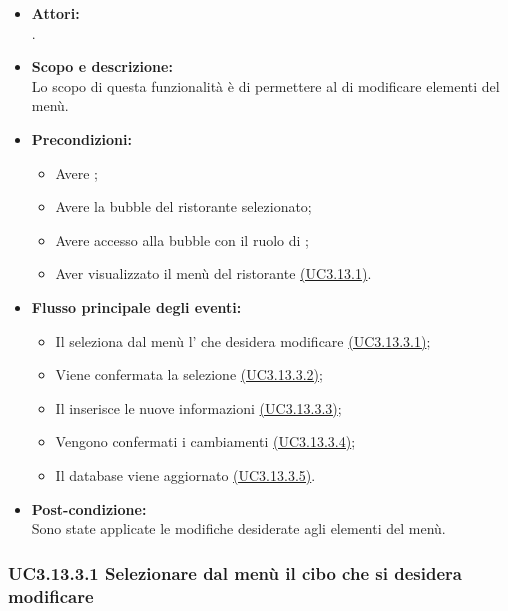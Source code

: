 \begin{itemize}
	\item \textbf{Attori:}
	\\.
	\item \textbf{Scopo e descrizione:} 
	\\Lo scopo di questa funzionalità è di permettere al  di modificare elementi del menù.
	\item \textbf{Precondizioni:}
	\begin{itemize}
		\item Avere ;
		\item Avere la bubble del ristorante selezionato;
		\item Avere accesso alla bubble con il ruolo di ;
		\item Aver visualizzato il menù del ristorante \hyperref[UC3.13.1]{(UC3.13.1)}.
	\end{itemize}
	\item \textbf{Flusso principale degli eventi:}
	\begin{itemize}
		\item Il  seleziona dal menù l’ che desidera modificare \hyperref[UC3.13.3.1]{(UC3.13.3.1)};
		\item Viene confermata la selezione \hyperref[UC3.13.3.2]{(UC3.13.3.2)};
		\item Il  inserisce le nuove informazioni \hyperref[UC3.13.3.3]{(UC3.13.3.3)};
		\item Vengono confermati i cambiamenti \hyperref[UC3.13.3.4]{(UC3.13.3.4)};
		\item Il database viene aggiornato \hyperref[UC3.13.3.5]{(UC3.13.3.5)}.
	\end{itemize}
	\item \textbf{Post-condizione:}
	\\Sono state applicate le modifiche desiderate agli elementi del menù.
\end{itemize}

\subsubsection{UC3.13.3.1  Selezionare dal menù il cibo che si desidera modificare} \label{UC3.13.3.1}

